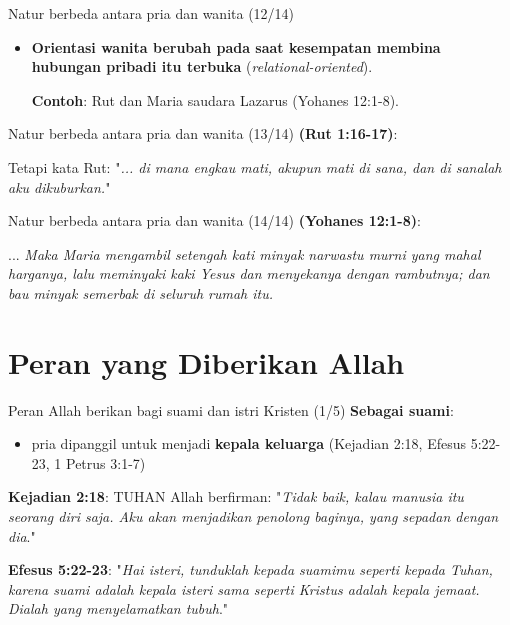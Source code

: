 \documentclass{beamer}
\theoremstyle{mystyle}
\let\emph\relax %
\begin{document}
\begin{frame}{Natur berbeda antara pria dan wanita (12/14)}
	\begin{itemize}
		\item<2-> \textbf{Orientasi wanita berubah pada saat kesempatan membina hubungan pribadi itu terbuka} (\textit{relational-oriented}).
		
		\bigskip		
		
		 \textbf{Contoh}: Rut dan Maria saudara Lazarus (Yohanes 12:1-8).		
	\end{itemize}
\end{frame}

\begin{frame}{Natur berbeda antara pria dan wanita (13/14)}
	\emph{Rut} \textbf{(Rut 1:16-17)}:  

	\bigskip	
	 Tetapi kata Rut: "\textit{... di mana engkau mati, akupun mati di sana, dan di sanalah aku dikuburkan.}"
	
\end{frame}

\begin{frame}{Natur berbeda antara pria dan wanita (14/14)}
	\emph{Maria saudara Lazarus} \textbf{(Yohanes 12:1-8)}: 

	\bigskip	
	 ... \textit{Maka Maria mengambil setengah kati minyak narwastu murni yang mahal harganya, lalu meminyaki kaki Yesus dan menyekanya dengan rambutnya; dan bau minyak semerbak di seluruh rumah itu.}
\end{frame}

\section{Peran yang Diberikan Allah}
\begin{frame}{Peran Allah berikan bagi suami dan istri Kristen (1/5)}
	\onslide<2-> \textbf{Sebagai suami}:
	\begin{itemize}
		\item<3-> pria dipanggil untuk menjadi \textbf{kepala keluarga} (Kejadian 2:18, Efesus 5:22-23, 1 Petrus 3:1-7)
	\end{itemize}
	\bigskip
	 \textbf{Kejadian 2:18}: TUHAN Allah berfirman: "\textit{Tidak baik, kalau manusia itu seorang diri saja. Aku akan menjadikan penolong baginya, yang sepadan dengan dia}."
	
	\bigskip
	 \textbf{Efesus 5:22-23}: "\textit{Hai isteri, tunduklah kepada suamimu seperti kepada Tuhan, karena suami adalah kepala isteri sama seperti Kristus adalah kepala jemaat. Dialah yang menyelamatkan tubuh}."
\end{frame}
\end{document}
